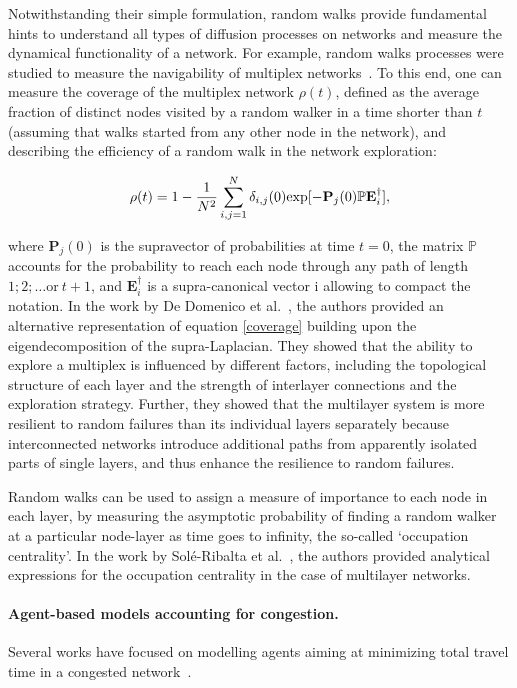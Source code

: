 Notwithstanding their simple formulation, random walks provide fundamental hints to understand all types of diffusion processes on networks and measure the dynamical functionality of a network. 
For example, random walks processes were studied to measure the navigability of multiplex networks~\cite{dedomenico2014interconnected}. 
To this end, one can measure the coverage of the multiplex network $\rho(t)$, defined as the average fraction of distinct nodes visited by a random walker in a time shorter than $t$ (assuming that walks started from any other node in the network), and describing the efficiency of a random walk in the network exploration:

\begin{equation}\label{coverage}
    \rho(t)=1-\\\frac{1}{N^2}\sum_{i,j=1}^{N}\delta_{i,j}(0)\text{exp}[-\mathbf{P}_j(0)\mathbb{P}\mathbf{E}_i^{\dagger}],
\end{equation}

where $\mathbf{P}_j(0)$ is the supravector of probabilities at time $t=0$, the matrix $\mathbb{P}$ accounts for the probability to reach each node through any path of length $1; 2; \dots \text{or}\ t+1$, and $\mathbf{E}_i^{\dagger}$ is a supra-canonical vector i allowing to compact the notation. In the work by De Domenico et al.~\cite{dedomenico2014interconnected}, the authors provided an alternative representation of equation \ref{coverage} building upon the eigendecomposition of the supra-Laplacian. They showed that the ability to explore a multiplex is influenced by different factors, including the topological structure of each layer and the strength of interlayer connections and the exploration strategy. Further, they showed that the multilayer system is more resilient to random failures than its individual layers separately because interconnected networks introduce additional paths from apparently isolated parts of single layers, and thus enhance the resilience to random failures.

Random walks can be used to assign a measure of importance to each node in each layer, by measuring the asymptotic probability of finding a random walker at a particular node-layer as time goes to infinity, the so-called `occupation centrality'\cite{sole2016random}. In the work by Sol\'{e}-Ribalta et al.~\cite{sole2016random}, the authors provided analytical expressions for the occupation centrality in the case of multilayer networks.

\paragraph{Agent-based models accounting for congestion.} 
Several works have focused on modelling agents aiming at minimizing total travel time in a congested network~\cite{tan2014congestion,bassolas2020scaling,manfredi2018congestion,sole-ribalta2016congestion}.

